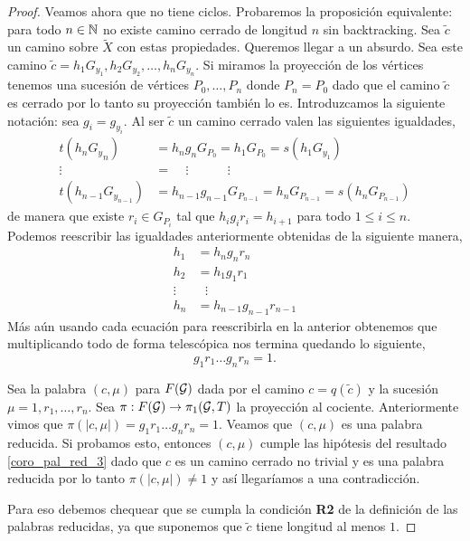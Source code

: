 \documentclass[tesis.tex]{subfiles}
\begin{document}
\begin{proof}
	Veamos ahora que no tiene ciclos.
	Probaremos la proposición equivalente: para todo $n \in \mathbb{N}$ no existe camino cerrado de longitud $n$ sin backtracking.
	Sea $\tilde c$ un camino sobre $\tilde X$ con estas propiedades. 
	Queremos llegar a un absurdo.
	Sea este camino $\tilde c = h_1G_{y_1}, h_2 G_{y_2}, \dots, h_n G_{y_n}$.
	Si miramos la proyección de los vértices tenemos una sucesión de vértices $P_0, \dots, P_n$ donde $P_n = P_0$ dado que el camino $\tilde c$ es cerrado por lo tanto su proyección también lo es.
	Introduzcamos la siguiente notación: sea $g_i = g_{y_i}$.
	Al ser $\tilde c$ un camino cerrado valen las siguientes igualdades,
	\begin{align*}
		t(h_n{G_y}_n) &= h_ng_nG_{P_0} = h_1G_{P_0} = s(h_1G_{ y_1}) \\ 
		\vdots \ \ \  &= \ \ \ \ \    \vdots\ \ \ \ \ \ \ \ \ \ \ \ \ \    \vdots \\
		t(h_{n-1}G_{y_{n-1}}) &= h_{n-1}g_{n-1}G_{P_{n-1}} = h_{n}G_{P_{n-1}} = s(h_nG_{P_{n-1}} )  
	\end{align*}
	de manera que existe $r_i \in G_{P_i}$ tal que $h_ig_ir_i = h_{i+1}$ para todo $1 \le i \le n$. 	
	Podemos reescribir las igualdades anteriormente obtenidas de la siguiente manera,
	\begin{align*}
		h_1 &= h_{n}g_{n}r_{n} \\
		h_2 &= h_1g_1r_1 \\
		\vdots & \ \ \ \vdots \\
		h_n &= h_{n-1}g_{n-1}r_{n-1} 
	\end{align*}
	Más aún usando cada ecuación para reescribirla en la anterior obtenemos que multiplicando todo de forma telescópica nos termina quedando lo siguiente,
	\begin{equation*}
		g_1r_1\dots g_nr_n = 1.
	\end{equation*} 
	
	
	Sea la palabra $(c, \mu)$ para $F({\cal G})$ dada por el camino $c= q(\tilde c)$ y la sucesión $\mu = 1,r_1, \dots, r_n$.
	Sea $\pi:F({\cal G}) \to \pi_1({\cal G},T)$ la proyección al cociente.
	Anteriormente vimos que $\pi(|c, \mu|) = g_1r_1\dots g_nr_n = 1$.
	Veamos que $(c, \mu)$ es una palabra reducida.
	Si probamos esto, entonces $(c, \mu)$ cumple las hipótesis del resultado \ref{coro_pal_red_3} dado que $c$ es un camino cerrado no trivial y es una palabra reducida por lo tanto $\pi(|c, \mu|) \neq 1$ y así llegaríamos a una contradicción.

	Para eso debemos chequear que se cumpla la condición \textbf{R2} de la definición de las palabras reducidas, ya que suponemos que $\tilde c$ tiene longitud al menos $1$.
	

\end{proof}
\end{document}
